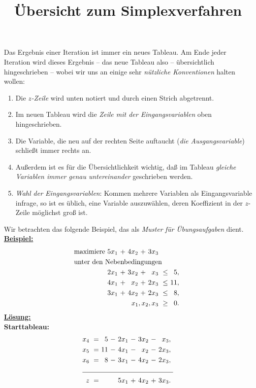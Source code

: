 \documentclass[a4paper]{article}
\begin{document}
 \title{\vspace*{-3cm}\"Ubersicht zum Simplexverfahren}
 \author{}
 \date{}
 \maketitle
 Das Ergebnis einer Iteration ist immer ein neues Tableau. Am Ende jeder Iteration wird dieses Ergebnis -- das neue Tableau also -- übersichtlich hingeschrieben -- wobei wir uns an einige sehr \emph{nützliche Konventionen} halten wollen:
 \begin{enumerate}[1)]
  \item Die \emph{$z$-Zeile} wird unten notiert und durch einen Strich abgetrennt.
  \item Im neuen Tableau wird die \emph{Zeile mit der Eingangsvariablen} oben hingeschrieben.
  \item Die Variable, die neu auf der rechten Seite auftaucht (\emph{die Ausgangsvariable}) schließt immer rechts an.
  \item Außerdem ist es für die Übersichtlichkeit wichtig, daß im Tableau \emph{gleiche Variablen immer genau untereinander} geschrieben werden.
  \item \emph{Wahl der Eingangsvariablen}: Kommen mehrere Variablen als Eingangsvariable infrage, so ist es üblich, eine Variable auszuwählen, deren Koeffizient in der $z$-Zeile möglichst groß ist.
 \end{enumerate}
  Wir betrachten das folgende Beispiel, das als \emph{Muster für Übungsaufgaben} dient.\\
  \underline{\textbf{Beispiel:}}
\begin{align*}
\begin{alignedat}{5}
& \text{maximiere } & 5x_1 &\ + &\ 4x_2 &\ + &\ 3x_3 & & \\
& \rlap{unter den Nebenbedingungen} & & & & & & & \\
&&  2x_1 &\ + &\ 3x_2 &\ + &\  x_3 &\ \leq &\ 5,\ \\
&& 4x_1 &\  + &\  x_2  &\ + &\ 2x_3 &\ \leq &\ 11,\ \\
&& 3x_1 &\ + &\  4x_2 &\ + &\ 2x_3 &\ \leq &\ 8,\ \\
&& & & & & \llap{$x_1, x_2, x_3$} &\ \geq &\ 0.\
\end{alignedat}
\end{align*}
\underline{\textbf{Lösung:}} \\ [0.2cm]
\textbf{Starttableau:}
\begin{align*}
\begin{alignedat}{5}
\label{eq:2:c1}
x_4 &\ = &\ 5 &\ - &\  2x_1 &\ - &\ 3x_2 &\ - &\  x_3,\ \\
x_5 &\ = &\ 11 &\ - &\  4x_1 &\ -  &\ x_2   &\ - &\ 2x_3,\ \\
x_6 &\ = &\ 8 &\ - &\ 3x_1 &\ - &\  4x_2 &\ - &\ 2x_3,\ \\ \cline{1-9}
  z &\ = &\   &\   &\ 5x_1 &\ + &\ 4x_2 &\ + &\ 3x_3.\
\end{alignedat}
\end{align*}
\end{document}
